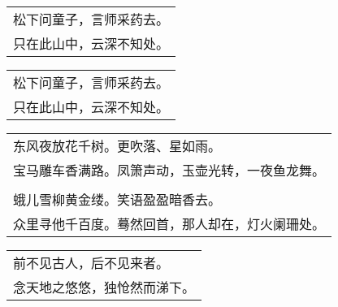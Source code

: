 \nopagebreak%
\nopagebreak%
\noindent\begin{minipage}{\linewidth}
  \vskip-3pt\begin{table}[H]
    \centering
    \begin{tabular}{@{}l@{}}
松下问童子，言师采药去。\\
只在此山中，云深不知处。
    \end{tabular}
  \end{table}
\end{minipage}
\vspace{1cm}


\nopagebreak%
\nopagebreak%
\noindent\begin{minipage}{\linewidth}
  \vskip-3pt\begin{table}[H]
    \centering
    \begin{tabular}{@{}l@{}}
松下问童子，言师采药去。\\
只在此山中，云深不知处。
    \end{tabular}
  \end{table}
\end{minipage}
\vspace{1cm}


\nopagebreak%
\nopagebreak%
\noindent\begin{minipage}{\linewidth}
  \vskip-3pt\begin{table}[H]
    \centering
    \begin{tabular}{@{}l@{}}
东风夜放花千树。更吹落、星如雨。\\
宝马雕车香满路。凤箫声动，玉壶光转，一夜鱼龙舞。\\
\\
蛾儿雪柳黄金缕。笑语盈盈暗香去。\\
众里寻他千百度。蓦然回首，那人却在，灯火阑珊处。
    \end{tabular}
  \end{table}
\end{minipage}
\vspace{1cm}


\nopagebreak%
\nopagebreak%
\noindent\begin{minipage}{\linewidth}
  \vskip-3pt\begin{table}[H]
    \centering
    \begin{tabular}{@{}l@{}}
前不见古人，后不见来者。\\
念天地之悠悠，独怆然而涕下。
    \end{tabular}
  \end{table}
\end{minipage}
\vspace{1cm}


